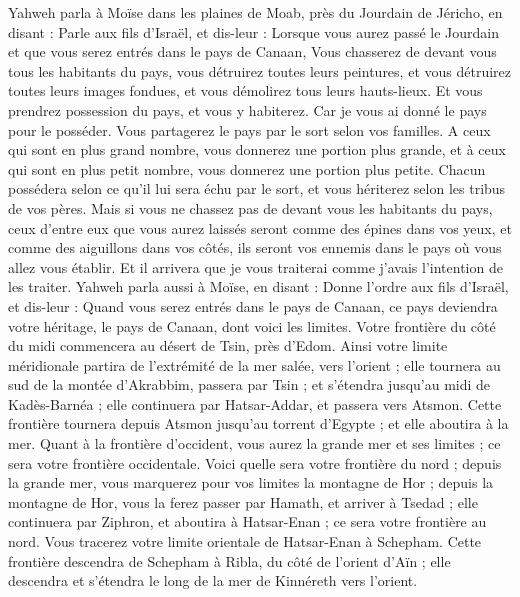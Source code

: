 \begin{multicols}{2}
Yahweh parla à Moïse dans les plaines de Moab, près du Jourdain de Jéricho, en disant :
Parle aux fils d'Israël, et dis-leur : Lorsque vous aurez passé le Jourdain et que vous serez entrés dans le pays de Canaan,
Vous chasserez de devant vous tous les habitants du pays, vous détruirez toutes leurs peintures, et vous détruirez toutes leurs images fondues, et vous démolirez tous leurs hauts-lieux.
Et vous prendrez possession du pays, et vous y habiterez. Car je vous ai donné le pays pour le posséder.
Vous partagerez le pays par le sort selon vos familles. A ceux qui sont en plus grand nombre, vous donnerez une portion plus grande, et à ceux qui sont en plus petit nombre, vous donnerez une portion plus petite. Chacun possédera selon ce qu'il lui sera échu par le sort, et vous hériterez selon les tribus de vos pères.
Mais si vous ne chassez pas de devant vous les habitants du pays, ceux d'entre eux que vous aurez laissés seront comme des épines dans vos yeux, et comme des aiguillons dans vos côtés, ils seront vos ennemis dans le pays où vous allez vous établir.
Et il arrivera que je vous traiterai comme j'avais l'intention de les traiter.
\VerseOne{}Yahweh parla aussi à Moïse, en disant :
Donne l'ordre aux fils d'Israël, et dis-leur : Quand vous serez entrés dans le pays de Canaan, ce pays deviendra votre héritage, le pays de Canaan, dont voici les limites.
Votre frontière du côté du midi commencera au désert de Tsin, près d'Edom. Ainsi votre limite méridionale partira de l'extrémité de la mer salée, vers l'orient ;
elle tournera au sud de la montée d'Akrabbim, passera par Tsin ; et s'étendra jusqu'au midi de Kadès-Barnéa ; elle continuera par Hatsar-Addar, et passera vers Atsmon.
Cette frontière tournera depuis Atsmon jusqu'au torrent d'Egypte ; et elle aboutira à la mer.
Quant à la frontière d'occident, vous aurez la grande mer et ses limites ; ce sera votre frontière occidentale.
Voici quelle sera votre frontière du nord ; depuis la grande mer, vous marquerez pour vos limites la montagne de Hor ;
depuis la montagne de Hor, vous la ferez passer par Hamath, et arriver à Tsedad ;
elle continuera par Ziphron, et aboutira à Hatsar-Enan ; ce sera votre frontière au nord.
Vous tracerez votre limite orientale de Hatsar-Enan à Schepham.
Cette frontière descendra de Schepham à Ribla, du côté de l'orient d'Aïn ; elle descendra et s'étendra le long de la mer de Kinnéreth vers l'orient.

\end{multicols}
